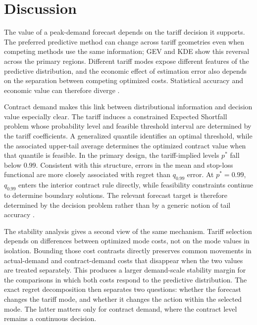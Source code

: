 \documentclass[suppldata]{interact}
\begin{document}
\FloatBarrier
\section{Discussion}
\label{sec:discussion}

The value of a peak-demand forecast depends on the tariff decision
it supports. The preferred predictive method
can change across tariff geometries even when competing methods use the
same information; GEV and KDE show this reversal across the primary
regions. Different tariff modes expose different features of the
predictive distribution, and the economic effect of estimation error
also depends on the separation between competing optimized costs.
Statistical accuracy and economic value can therefore diverge
\citep{BeykirchEtAl2024,StratigakosEtAl2025,MaciejowskaEtAl2026,HoubenEtAl2026}.

Contract demand makes this link between distributional information and
decision value especially clear. The tariff induces a constrained
Expected Shortfall problem whose probability level and feasible
threshold interval are determined by the tariff coefficients. A
generalized quantile identifies an optimal threshold, while the
associated upper-tail average determines the optimized contract value
when that quantile is feasible. In the primary design, the
tariff-implied levels $p^\ast$ fall below $0.99$. Consistent with
this structure, errors in the mean and stop-loss functional are more
closely associated with regret than $q_{0.99}$ error. At
$p^\ast=0.99$, $q_{0.99}$ enters the interior contract rule directly,
while feasibility constraints continue to determine boundary solutions.
The relevant forecast target is therefore determined by the decision
problem rather than by a generic notion of tail accuracy
\citep{WangEtAl2023,BeykirchEtAl2024}.

The stability analysis gives a second view of the same mechanism.
Tariff selection depends on differences between optimized mode costs,
not on the mode values in isolation. Bounding those cost contrasts
directly preserves common movements in actual-demand and
contract-demand costs that disappear when the two values are treated
separately. This produces a larger demand-scale stability margin for
the comparisons in which both costs respond to the predictive
distribution. The exact regret decomposition then separates two
questions: whether the forecast changes the tariff mode, and whether
it changes the action within the selected mode. The latter matters only
for contract demand, where the contract level remains a continuous
decision.
\end{document}

